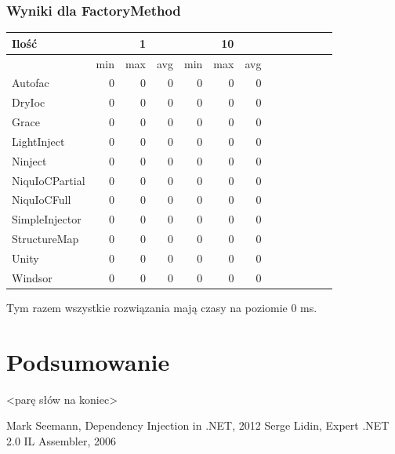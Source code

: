 \documentclass[12pt]{article}
\begin{document}
\subsubsection{Wyniki dla FactoryMethod}
\begin{center}
\begin{small}
	\begin{tabular}{ | l | r r r | r r r | r r r | r r r | }
    		\hline
Ilość & & 1 & & & 10 & \\ \hline
 & min & max & avg & min & max & avg \\ \hline
Autofac & 0 & 0 & 0 & 0 & 0 & 0 \\ \hline
DryIoc & 0 & 0 & 0 & 0 & 0 & 0 \\ \hline
Grace & 0 & 0 & 0 & 0 & 0 & 0 \\ \hline
LightInject & 0 & 0 & 0 & 0 & 0 & 0 \\ \hline
Ninject & 0 & 0 & 0 & 0 & 0 & 0 \\ \hline
NiquIoCPartial & 0 & 0 & 0 & 0 & 0 & 0 \\ \hline
NiquIoCFull & 0 & 0 & 0 & 0 & 0 & 0 \\ \hline
SimpleInjector & 0 & 0 & 0 & 0 & 0 & 0 \\ \hline
StructureMap & 0 & 0 & 0 & 0 & 0 & 0 \\ \hline
Unity & 0 & 0 & 0 & 0 & 0 & 0 \\ \hline
Windsor & 0 & 0 & 0 & 0 & 0 & 0 \\ \hline
  	\end{tabular}
\end{small}
\end{center}
Tym razem wszystkie rozwiązania mają czasy na poziomie 0 ms.



\clearpage
\section{Podsumowanie}
<parę słów na koniec>

\newpage
\begin{thebibliography}{authordate1}
 Mark Seemann, Dependency Injection in .NET, 2012
 Serge Lidin, Expert .NET 2.0 IL Assembler, 2006
\end{thebibliography}
\end{document}
